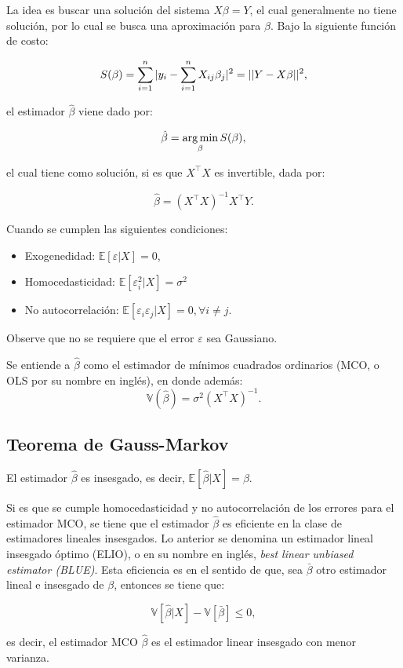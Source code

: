 \begin{definition}

La idea es buscar una solución del sistema $X\beta=Y$, el cual generalmente no tiene solución, por lo cual se busca una aproximación para $\beta$. Bajo la siguiente función de costo:

\[S(\beta)=\sum\limits_{i=1}^{n}|y_i-\sum\limits\limits_{i=1}^{n}X_{ij}\beta_{j}|^2=||Y-X\beta||^2,\]

el estimador $\hat{\beta}$ viene dado por:

\[\hat{\beta}=\operatorname*{arg\,min}_\beta S(\beta),\]

el cual tiene como solución, si es que $X^\top X$ es invertible, dada por:

$$
\hat{\beta}= (X^\top X)^{-1}X^\top Y.
$$

Cuando se cumplen las siguientes condiciones:
\begin{itemize}
    \item Exogenedidad: $\mathbb{E}[\varepsilon|X]=0$, 
    \item Homocedasticidad: $\mathbb{E}[\varepsilon^2_i|X]=\sigma^2 $
    \item No autocorrelación: $\mathbb{E}[\varepsilon_i\varepsilon_j|X]=0,\forall i\neq j$.
\end{itemize}

Observe que no se requiere que el error $\varepsilon$ sea Gaussiano. 

Se entiende a $\hat{\beta}$ como el estimador de mínimos cuadrados ordinarios (MCO, o OLS por su nombre en inglés), en donde además:
$$
\mathbb{V}(\hat{\beta})= \sigma^{2}(X^\top X)^{-1}.
$$
\end{definition}

\subsection{Teorema de Gauss-Markov}

\begin{prop}
El estimador $\hat{\beta}$ es insesgado, es decir, $\mathbb{E}[\hat{\beta}|X]=\beta$.
\end{prop}

\begin{theorem}
Si es que se cumple homocedasticidad y no autocorrelación de los errores para el estimador MCO, se tiene que el estimador $\hat{\beta}$ es eficiente en la clase de estimadores lineales insesgados. Lo anterior se denomina un estimador lineal insesgado óptimo (ELIO), o en su nombre en inglés, \emph{best linear unbiased estimator (BLUE)}. Esta eficiencia es en el sentido de que, sea $\bar{\beta}$ otro estimador lineal e insesgado de $\beta$, entonces se tiene que:

\[\mathbb{V}[\hat{\beta}|X]-\mathbb{V}[\bar{\beta}]\leq 0,\]
\end{theorem}
es decir, el estimador MCO $\hat{\beta}$ es el estimador linear insesgado con menor varianza. 




